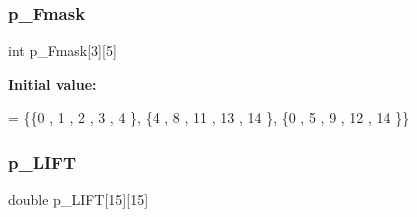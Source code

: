 \subsubsection{\texorpdfstring{p\+\_\+\+Fmask}{p\_Fmask}}
{\footnotesize\ttfamily int p\+\_\+\+Fmask\mbox{[}3\mbox{]}\mbox{[}5\mbox{]}}

{\bfseries Initial value\+:}
\begin{DoxyCode}
= \{\{0 , 1 , 2 , 3 , 4 \},
\{4 , 8 , 11 , 13 , 14 \},
\{0 , 5 , 9 , 12 , 14 \}\}
\end{DoxyCode}
\mbox{\label{a00515_a76c7bb07fd19526963754351ba297f11}} 
\subsubsection{\texorpdfstring{p\+\_\+\+L\+I\+FT}{p\_LIFT}}
{\footnotesize\ttfamily double p\+\_\+\+L\+I\+FT\mbox{[}15\mbox{]}\mbox{[}15\mbox{]}}

